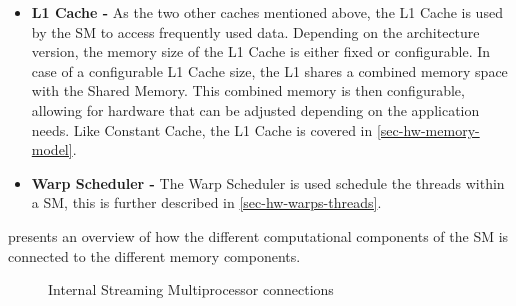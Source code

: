 \begin{itemize}
	
	\item \textbf{L1 Cache -} As the two other caches mentioned above, the L1 Cache is used by the SM to access frequently used data. 
	Depending on the architecture version, the memory size of the L1 Cache is either fixed or configurable.
	In case of a configurable L1 Cache size, the L1 shares a combined memory space with the Shared Memory.
	This combined memory is then configurable, allowing for hardware that can be adjusted depending on the application needs. Like Constant Cache, the L1 Cache is covered in \cref{sec-hw-memory-model}.

	\item  \textbf{Warp Scheduler -} The Warp Scheduler is used schedule the threads within a SM, this is further described in \cref{sec-hw-warps-threads}.
		
\end{itemize}

 presents an overview of how the different computational components of the SM is connected to the different memory components.

\begin{figure}[H]
	\centering
	\caption{Internal Streaming Multiprocessor connections}
	\label{fig:hw-sm-inside}
\end{figure}